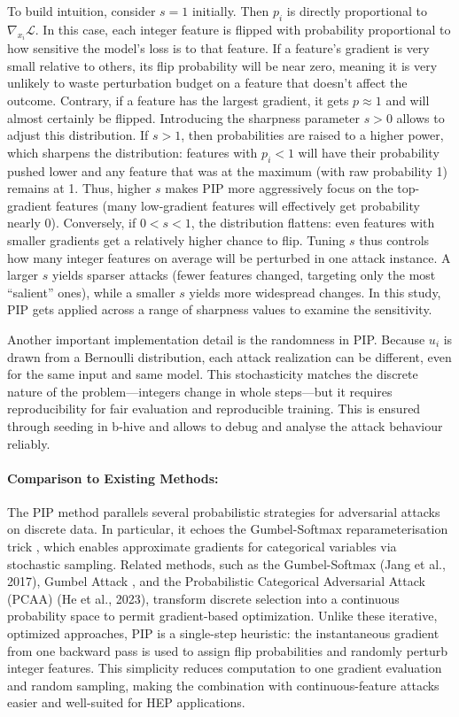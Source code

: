 To build intuition, consider $s=1$ initially. Then $p_i$ is directly proportional to 
$\nabla_{x_i} \mathcal{L}$. In this case, each integer feature is flipped with probability proportional to how sensitive the model’s loss is to that feature. If a feature’s gradient is very small relative to others, its flip probability will be near zero, meaning it is very unlikely to waste perturbation budget on a feature that doesn’t affect the outcome. Contrary, if a feature has the largest gradient, it gets $p\approx1$ and will almost certainly be flipped. Introducing the sharpness parameter $s>0$ allows to adjust this distribution. If $s>1$, then probabilities are raised to a higher power, which sharpens the distribution: features with $p_i<1$ will have their probability pushed lower and any feature that was at the maximum (with raw probability 1) remains at 1. Thus, higher $s$ makes PIP more aggressively focus on the top-gradient features (many low-gradient features will effectively get probability nearly 0). Conversely, if $0<s<1$, the distribution flattens: even features with smaller gradients get a relatively higher chance to flip. Tuning $s$ thus controls how many integer features on average will be perturbed in one attack instance. A larger $s$ yields sparser attacks (fewer features changed, targeting only the most “salient” ones), while a smaller $s$ yields more widespread changes. In this study, PIP gets applied across a range of sharpness values to examine the sensitivity.

Another important implementation detail is the randomness in PIP. Because $u_i$ is drawn from a Bernoulli distribution, each attack realization can be different, even for the same input and same model. This stochasticity matches the discrete nature of the problem—integers change in whole steps—but it requires reproducibility for fair evaluation and reproducible training. This is ensured through seeding in b-hive and allows to debug and analyse the attack behaviour reliably.


\paragraph{Comparison to Existing Methods:}
The PIP method parallels several probabilistic strategies for adversarial attacks on discrete data. In particular, it echoes the Gumbel-Softmax reparameterisation trick \cite{xu2023probabilisticcategoricaladversarialattack}, which enables approximate gradients for categorical variables via stochastic sampling. Related methods, such as the Gumbel-Softmax (Jang et al., 2017), Gumbel Attack \cite{yang2018greedyattackgumbelattack}, and the Probabilistic Categorical Adversarial Attack (PCAA) (He et al., 2023), transform discrete selection into a continuous probability space to permit gradient-based optimization. Unlike these iterative, optimized approaches, PIP is a single-step heuristic: the instantaneous gradient from one backward pass is used to assign flip probabilities and randomly perturb integer features. This simplicity reduces computation to one gradient evaluation and random sampling, making the combination with continuous-feature attacks easier and well-suited for HEP applications.

